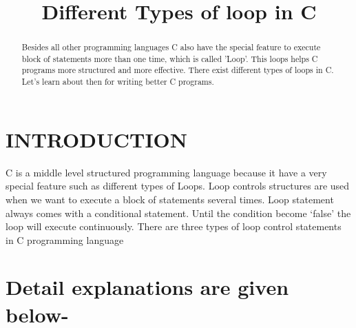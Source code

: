 \documentclass[conference]{IEEEtran}
\begin{document}
\title{Different Types of loop in C}

\author{
}

\maketitle

\begin{abstract}
Besides all other programming languages C also have the special feature to execute block of statements more than one time, which is called 'Loop'. This loops helps C programs more structured and more effective. There exist different types of loops in C. Let's learn about then for writing better C programs.
\end{abstract}

\section{INTRODUCTION}
C is a middle level structured programming language because it have a very special feature such as different types of Loops. Loop controls structures are used when we want to execute a block of statements several times. Loop statement always comes with a conditional statement. Until the condition become ‘false’ the loop will execute continuously. There are three types of loop control statements in C programming language



\section{Detail explanations are given below-}
\end{document}
